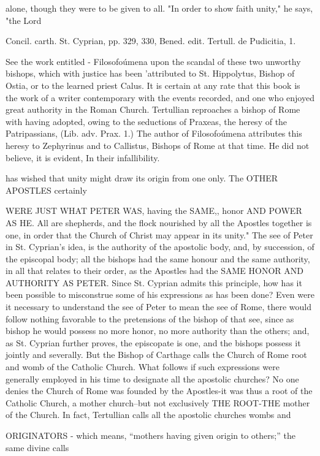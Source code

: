 alone, though they were to be given to all. "In order to show faith unity," he says, "the Lord

Concil. carth. St. Cyprian, pp. 329, 330, Bened. edit. Tertull. de Pudicitia, 1.

See the work entitled - Filosofoúmena upon the scandal of these two unworthy bishops, which with justice has been 'attributed to St. Hippolytus, Bishop of Ostia, or to the learned priest Calus. It is certain at any rate that this book is the work of a writer contemporary with the events recorded, and one who enjoyed great authority in the Roman Church. Tertullian reproaches a bishop of Rome with having adopted, owing to the seductions of Praxeas, the heresy of the Patripassians, (Lib. adv. Prax. 1.) The author of Filosofoúmena attributes this heresy to Zephyrinus and to Callistus, Bishops of Rome at that time. He did not believe, it is evident, In their infallibility.

has wished that unity might draw its origin from one only. The OTHER APOSTLES certainly

WERE JUST WHAT PETER WAS, having the SAME,, honor AND POWER AS HE. All are shepherds, and the flock nourished by all the Apostles together is one, in order that the Church of Christ may appear in its unity." The see of Peter in St. Cyprian's idea, is the authority of the apostolic body, and, by succession, of the episcopal body; all the bishops had the same honour and the same authority, in all that relates to their order, as the Apostles had the SAME HONOR AND AUTHORITY AS PETER. Since St. Cyprian admits this principle, how has it been possible to misconstrue some of his expressions as has been done? Even were it necessary to understand the see of Peter to mean the see of Rome, there would follow nothing favorable to the pretensions of the bishop of that see, since as bishop he would possess no more honor, no more authority than the others; and, as St. Cyprian further proves, the episcopate is one, and the bishops possess it jointly and severally. But the Bishop of Carthage calls the Church of Rome root and womb of the Catholic Church. What follows if such expressions were generally employed in his time to designate all the apostolic churches? No one denies the Church of Rome was founded by the Apostles-it was thus a root of the Catholic Church, a mother church--but not exclusively THE ROOT-THE mother of the Church. In fact, Tertullian calls all the apostolic churches wombs and

ORIGINATORS - which means, “mothers having given origin to others;” the same divine calls

